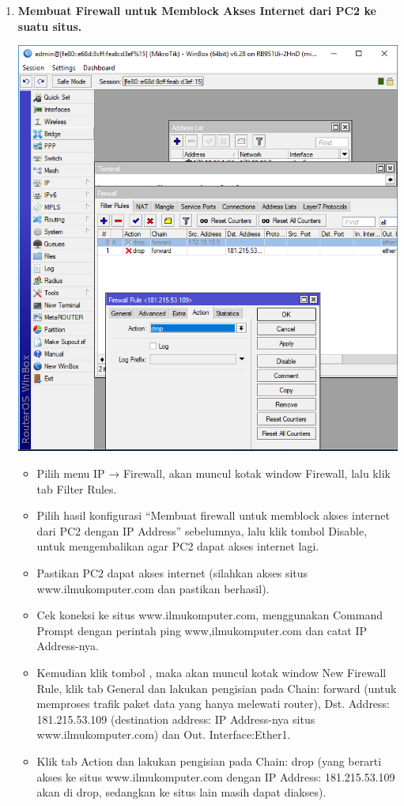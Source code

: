 \documentclass[a4paper,12pt]{article}
\begin{document}
\begin{enumerate}[label=\textbf{\arabic*.}]
    \item \textbf{Membuat Firewall untuk Memblock Akses Internet dari PC2 ke suatu situs.}
        \begin{center}
            \includegraphics[width=0.8\linewidth]{image17.png}
        \end{center}
        \begin{itemize}
            \item Pilih menu IP → Firewall, akan muncul kotak window Firewall, lalu klik tab Filter Rules.
            \item Pilih hasil konfigurasi “Membuat firewall untuk memblock akses internet dari PC2 dengan IP Address” sebelumnya, lalu klik tombol Disable, untuk mengembalikan agar PC2 dapat akses internet lagi.
            \item Pastikan PC2 dapat akses internet (silahkan akses situs www.ilmukomputer.com dan pastikan berhasil).
            \item Cek koneksi ke situs www.ilmukomputer.com, menggunakan Command Prompt dengan perintah ping www,ilmukomputer.com dan catat IP Address-nya.
            \item Kemudian klik tombol  , maka akan muncul kotak window New Firewall Rule, klik tab General dan lakukan pengisian pada Chain: forward (untuk memproses trafik paket data yang hanya melewati router), Dst. Address: 181.215.53.109 (destination address: IP Address-nya situs www.ilmukomputer.com) dan Out. Interface:Ether1.
            \item Klik tab Action dan lakukan pengisian pada Chain: drop (yang berarti akses ke situs www.ilmukomputer.com dengan IP Address: 181.215.53.109 akan di drop, sedangkan ke situs lain masih dapat diakses).
        \end{itemize}


\end{enumerate}
\end{document}
